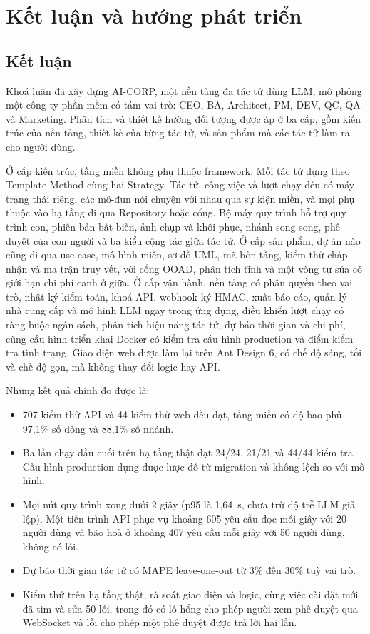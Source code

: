 \chapter{Kết luận và hướng phát triển}
\label{chap:ket-luan}

\section{Kết luận}

Khoá luận đã xây dựng AI-CORP, một nền tảng đa tác tử dùng LLM, mô phỏng một công ty phần mềm có tám vai trò: CEO, BA, Architect, PM, DEV, QC, QA và Marketing. Phân tích và thiết kế hướng đối tượng được áp ở ba cấp, gồm kiến trúc của nền tảng, thiết kế của từng tác tử, và sản phẩm mà các tác tử làm ra cho người dùng.

Ở cấp kiến trúc, tầng miền không phụ thuộc framework. Mỗi tác tử dựng theo Template Method cùng hai Strategy. Tác tử, công việc và lượt chạy đều có máy trạng thái riêng, các mô-đun nói chuyện với nhau qua sự kiện miền, và mọi phụ thuộc vào hạ tầng đi qua Repository hoặc cổng. Bộ máy quy trình hỗ trợ quy trình con, phiên bản bất biến, ảnh chụp và khôi phục, nhánh song song, phê duyệt của con người và ba kiểu cộng tác giữa tác tử. Ở cấp sản phẩm, dự án nào cũng đi qua use case, mô hình miền, sơ đồ UML, mã bốn tầng, kiểm thử chấp nhận và ma trận truy vết, với cổng OOAD, phân tích tĩnh và một vòng tự sửa có giới hạn chi phí canh ở giữa. Ở cấp vận hành, nền tảng có phân quyền theo vai trò, nhật ký kiểm toán, khoá API, webhook ký HMAC, xuất báo cáo, quản lý nhà cung cấp và mô hình LLM ngay trong ứng dụng, điều khiển lượt chạy có ràng buộc ngân sách, phân tích hiệu năng tác tử, dự báo thời gian và chi phí, cùng cấu hình triển khai Docker có kiểm tra cấu hình production và điểm kiểm tra tình trạng. Giao diện web được làm lại trên Ant Design 6, có chế độ sáng, tối và chế độ gọn, mà không thay đổi logic hay API.

Những kết quả chính đo được là:

\begin{itemize}
\item 707 kiểm thử API và 44 kiểm thử web đều đạt, tầng miền có độ bao phủ 97,1\% số dòng và 88,1\% số nhánh.
\item Ba lần chạy đầu cuối trên hạ tầng thật đạt 24/24, 21/21 và 44/44 kiểm tra. Cấu hình production dựng được lược đồ từ migration và không lệch so với mô hình.
\item Mọi nút quy trình xong dưới 2 giây (p95 là 1,64~s, chưa trừ độ trễ LLM giả lập). Một tiến trình API phục vụ khoảng 605 yêu cầu đọc mỗi giây với 20 người dùng và bão hoà ở khoảng 407 yêu cầu mỗi giây với 50 người dùng, không có lỗi.
\item Dự báo thời gian tác tử có MAPE leave-one-out từ 3\% đến 30\% tuỳ vai trò.
\item Kiểm thử trên hạ tầng thật, rà soát giao diện và logic, cùng việc cài đặt mới đã tìm và sửa 50 lỗi, trong đó có lỗ hổng cho phép người xem phê duyệt qua WebSocket và lỗi cho phép một phê duyệt được trả lời hai lần.
\end{itemize}

